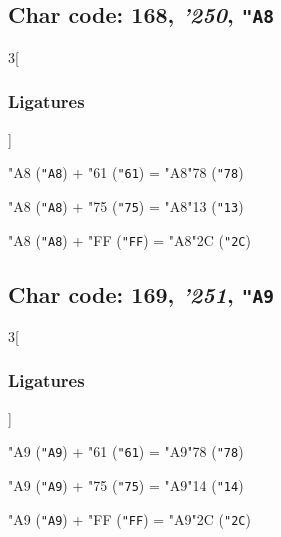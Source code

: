 \documentclass{article}
\newlength{\maxcharwidth}
\begin{document}
\subsection{Char code: 168, {\it'250}, {\tt"A8}}
\label{char_168}


\begin{multicols}{3}[\subsubsection{Ligatures}]

{\testfont\char"A8\noboundary} ({\tt"A8}) + {\testfont\char"61\noboundary} ({\tt"61}) = {\testfont\char"A8\noboundary}{\testfont\char"78\noboundary} ({\tt"78}) 

{\testfont\char"A8\noboundary} ({\tt"A8}) + {\testfont\char"75\noboundary} ({\tt"75}) = {\testfont\char"A8\noboundary}{\testfont\char"13\noboundary} ({\tt"13}) 

{\testfont\char"A8\noboundary} ({\tt"A8}) + {\testfont\char"FF\noboundary} ({\tt"FF}) = {\testfont\char"A8\noboundary}{\testfont\char"2C\noboundary} ({\tt"2C}) 

\end{multicols}

\subsection{Char code: 169, {\it'251}, {\tt"A9}}
\label{char_169}


\begin{multicols}{3}[\subsubsection{Ligatures}]

{\testfont\char"A9\noboundary} ({\tt"A9}) + {\testfont\char"61\noboundary} ({\tt"61}) = {\testfont\char"A9\noboundary}{\testfont\char"78\noboundary} ({\tt"78}) 

{\testfont\char"A9\noboundary} ({\tt"A9}) + {\testfont\char"75\noboundary} ({\tt"75}) = {\testfont\char"A9\noboundary}{\testfont\char"14\noboundary} ({\tt"14}) 

{\testfont\char"A9\noboundary} ({\tt"A9}) + {\testfont\char"FF\noboundary} ({\tt"FF}) = {\testfont\char"A9\noboundary}{\testfont\char"2C\noboundary} ({\tt"2C}) 

\end{multicols}
\end{document}
